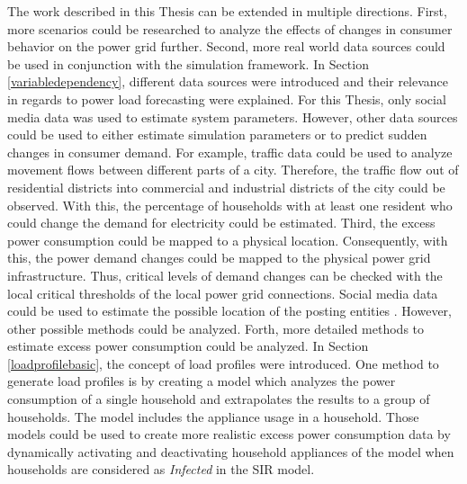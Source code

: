 The work described in this Thesis can be extended in multiple
directions. First, more scenarios could be researched 
to analyze the effects of changes in consumer behavior
on the power grid further. Second, more real world 
data sources could be used in conjunction with the 
simulation framework.
In Section \ref{variabledependency}, different data 
sources were introduced and their relevance in regards 
to power load forecasting were explained. For this
Thesis, only social media data was used to estimate system 
parameters. However, other data sources could be used
to either estimate simulation parameters or to predict
sudden changes in consumer demand. For example,
traffic data could be used to analyze movement flows 
between different parts of a city. Therefore, the
traffic flow out of residential districts into 
commercial and industrial districts of the city 
could be observed. With this,
the percentage of households with at least one 
resident who could change the demand for electricity
could be estimated.
Third, the excess power consumption could be mapped
to a physical location. Consequently, with this, 
the power demand changes could be mapped to the 
physical power grid infrastructure. Thus, 
critical levels of demand changes can be 
checked with the local critical thresholds of the
local power grid connections. Social media data could
be used to estimate the possible location of the 
posting entities \cite{jurgens2015geolocation}.
However, other possible methods could be analyzed.
Forth, more detailed methods to estimate excess 
power consumption could be analyzed.
In Section \ref{loadprofilebasic}, the concept 
of load profiles were introduced. One 
method to generate load profiles is by 
creating a model which 
analyzes the power consumption of a single 
household and extrapolates the results to 
a group of households. The model includes 
the appliance usage in a household. 
Those models could be used to create more 
realistic excess power consumption data
by dynamically activating and deactivating
household appliances of the model when 
households are considered as 
\textit{Infected} in the SIR model.




